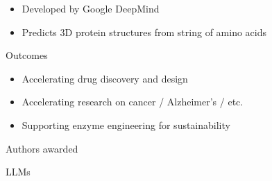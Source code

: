 \begin{frame}

    \begin{itemize}
        \item Developed by Google DeepMind 
            \vspace{0.5em}
        \item Predicts 3D protein structures from string of amino acids
            \vspace{0.5em}
    \end{itemize}


    \vspace{0.5em}
    Outcomes

    \begin{itemize}
        \item Accelerating drug discovery and design
            \vspace{0.5em}
        \item Accelerating research on cancer / Alzheimer's / etc.
            \vspace{0.5em}
        \item Supporting enzyme engineering for sustainability
    \end{itemize}

    \vspace{0.5em}
    \vspace{0.5em}
    Authors awarded 

\end{frame}


%
%     
%

\begin{frame}{LLMs}
    
    \begin{figure}
       \centering
    \end{figure}

\end{frame}


